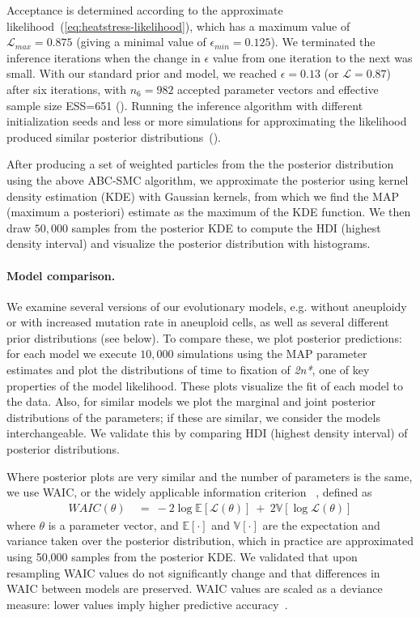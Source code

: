 \documentclass[12pt]{extarticle}
\newcommand{\likelihood}{\mathcal{L}}
\newcommand{\eumt}{\emph{2n*}}
\begin{document}
Acceptance is determined according to the approximate likelihood~(\cref{eq:heatstress-likelihood}), which has a maximum value of $\likelihood_{max}=0.875$ (giving a minimal value of $\epsilon_{min}=0.125$). We terminated the inference iterations when the change in $\epsilon$ value from one iteration to the next was small.
With our standard prior and model, we reached $\epsilon=0.13$ (or $\likelihood=0.87$) after six iterations, with $n_6=982$ accepted parameter vectors and effective sample size ESS=651 (). Running the inference algorithm with different initialization seeds and less or more simulations for approximating the likelihood produced similar posterior distributions~(). 

After producing a set of weighted particles from the the posterior distribution using the above ABC-SMC algorithm, we approximate the posterior using kernel density estimation (KDE) with Gaussian kernels, from which we find the MAP (maximum a posteriori) estimate as the maximum of the KDE function. We then draw $50,000$ samples from the posterior KDE to compute the HDI (highest density interval) and visualize the posterior distribution with histograms.


\paragraph{Model comparison.} 
We examine several versions of our evolutionary models, e.g. without aneuploidy or with increased mutation rate in aneuploid cells, as well as several different prior distributions (see below).
To compare these, we plot posterior predictions: for each model we execute $10,000$ simulations using the MAP parameter estimates and plot the distributions of time to fixation of \eumt, one of key properties of the model likelihood. These plots visualize the fit of each model to the data. 
Also, for similar models we plot the marginal and joint posterior distributions of the parameters; if these are similar, we consider the models interchangeable. We validate this by comparing HDI (highest density interval) of posterior distributions.

Where posterior plots are very similar and the number of parameters is the same, we use WAIC, or the widely applicable information criterion ~\citep{gelman2013bayesian}, defined as
\begin{equation} \label{eq:WAIC}
\begin{aligned}
\mathit{WAIC}(\theta) &\ =\ 
-2\log\mathbb{E}[\likelihood(\theta)]\ +\ 2\mathbb{V}[\log\likelihood(\theta)]
\end{aligned}
\end{equation}
where $\theta$ is a parameter vector, and $\mathbb{E}[\cdot]$ and $\mathbb{V}[\cdot]$ are the expectation and variance taken over the posterior distribution, which in practice are approximated using 50,000 samples from the posterior KDE. We validated that upon resampling WAIC values do not significantly change and that differences in WAIC between models are preserved.
WAIC values are scaled as a deviance measure: lower values imply higher predictive accuracy~\citep{Kass1995}.
 
\end{document}
